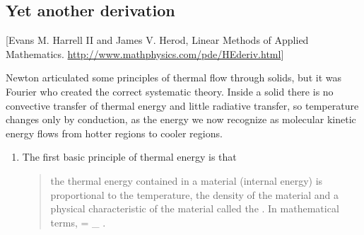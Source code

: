 \subsection{Yet another derivation}
[Evans M. Harrell II and James V. Herod, Linear Methods of Applied Mathematics. \url{http://www.mathphysics.com/pde/HEderiv.html}]

Newton articulated some principles of thermal flow through solids, but it was Fourier who created the correct systematic theory. Inside a solid there is no convective transfer of thermal energy and little radiative transfer, so temperature changes only by conduction, as the energy we now recognize as molecular kinetic energy flows from hotter regions to cooler regions. 

\begin{enumerate}
\item The first basic principle of thermal energy is that
\begin{quote}
the thermal energy contained in a material (internal energy) is proportional to the temperature, the density of the material and a physical characteristic of the material called the . In mathematical terms,
\beq
\ien = \int_\vol\dens\kshcap\temp{}\,\dx\vol\,.
\eeq
\end{quote}


\end{enumerate}
